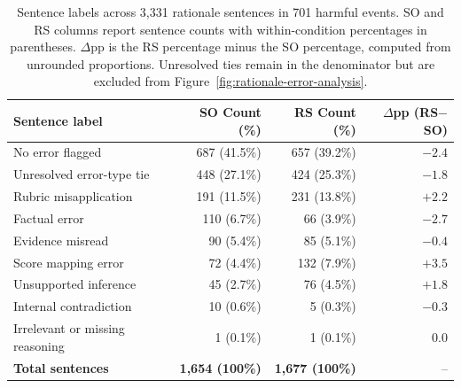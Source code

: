 \begin{table}[!tp]
\centering
\captionsetup{font=normalsize,skip=2pt}
\small
\setlength{\tabcolsep}{6pt}
\renewcommand{\arraystretch}{1.05}

\begin{tabular}{@{}lrrr@{}}
\toprule
Sentence label
& SO Count (\%)
& RS Count (\%)
& $\Delta$pp (RS$-$SO) \\
\midrule

No error flagged
& 687 (41.5\%)
& 657 (39.2\%)
& $-2.4$ \\

Unresolved error-type tie
& 448 (27.1\%)
& 424 (25.3\%)
& $-1.8$ \\

Rubric misapplication
& 191 (11.5\%)
& 231 (13.8\%)
& $\mathbf{+2.2}$ \\

Factual error
& 110 (6.7\%)
& 66 (3.9\%)
& $\mathbf{-2.7}$ \\

Evidence misread
& 90 (5.4\%)
& 85 (5.1\%)
& $-0.4$ \\

Score mapping error
& 72 (4.4\%)
& 132 (7.9\%)
& $\mathbf{+3.5}$ \\

Unsupported inference
& 45 (2.7\%)
& 76 (4.5\%)
& $\mathbf{+1.8}$ \\

Internal contradiction
& 10 (0.6\%)
& 5 (0.3\%)
& $-0.3$ \\

Irrelevant or missing reasoning
& 1 (0.1\%)
& 1 (0.1\%)
& $0.0$ \\

\midrule
\textbf{Total sentences}
& \textbf{1,654 (100\%)}
& \textbf{1,677 (100\%)}
& -- \\
\bottomrule
\end{tabular}

\caption{Sentence labels across 3,331 rationale sentences in 701
harmful events. SO and RS columns report sentence counts with within-condition
percentages in parentheses. $\Delta$pp is the RS percentage minus the SO
percentage, computed from unrounded proportions. Unresolved ties remain
in the denominator but are excluded from
Figure~\ref{fig:rationale-error-analysis}.}
\label{tab:full-sentence-errors}
\end{table}


